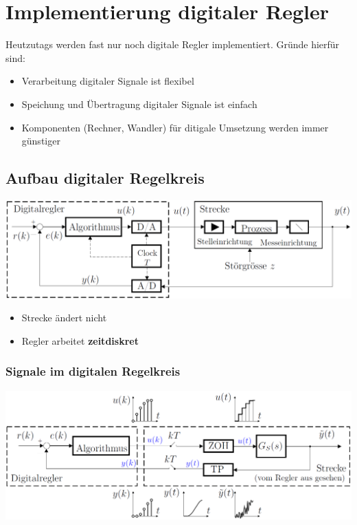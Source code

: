 \section{Implementierung digitaler Regler}

Heutzutags werden fast nur noch digitale Regler implementiert. Gründe hierfür sind:

\begin{itemize}
    \item Verarbeitung digitaler Signale ist flexibel
    \item Speichung und Übertragung digitaler Signale ist einfach
    \item Komponenten (Rechner, Wandler) für ditigale Umsetzung werden immer günstiger
\end{itemize}


\subsection{Aufbau digitaler Regelkreis}

\begin{minipage}[c]{0.63\columnwidth}
    \includegraphics[width=\columnwidth]{images/regelkreis_mit_digitalregler.png}
\end{minipage}
\hfill
\begin{minipage}[c]{0.35\columnwidth}
    \begin{itemize}
        \item Strecke ändert nicht
        \item Regler arbeitet \textbf{zeitdiskret}
    \end{itemize}
\end{minipage}


\subsubsection{Signale im digitalen Regelkreis}

\begin{center}
    \includegraphics[width=0.75\columnwidth]{images/digitaler_regelkreis_signaltypen.png}
\end{center}


